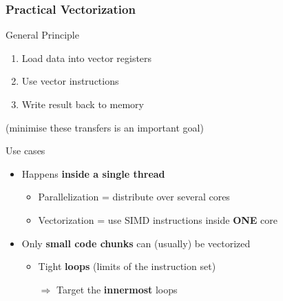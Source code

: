 \documentclass[xcolor={x11names,svgnames}]{beamer}
\newcommand{\red}[1]{{\color{red}#1}}
\begin{document}
\begin{frame}
  \frametitle{Practical Vectorization}

  \begin{block}{General Principle}
    \begin{enumerate}
    \item Load data into vector registers
    \item Use vector instructions
    \item Write result back to memory
    \end{enumerate}
  \end{block}

  (minimise these transfers is an important goal)
  
  \begin{alertblock}{Use cases}
    \begin{itemize}
    \item Happens \textbf{inside a \alert{single} thread}
      \begin{itemize}
      \item Parallelization = distribute over several cores
      \item Vectorization = use SIMD instructions inside \textbf{\red{ONE}} core
      \end{itemize}
    \item Only \textbf{small code chunks} can (usually) be vectorized
      \begin{itemize}
      \item Tight \textbf{loops} (limits of the instruction set) 
      \item [$\Rightarrow$] Target the \textbf{innermost} loops
      \end{itemize}
    \end{itemize}
  \end{alertblock}
\end{frame}  

\end{document}
